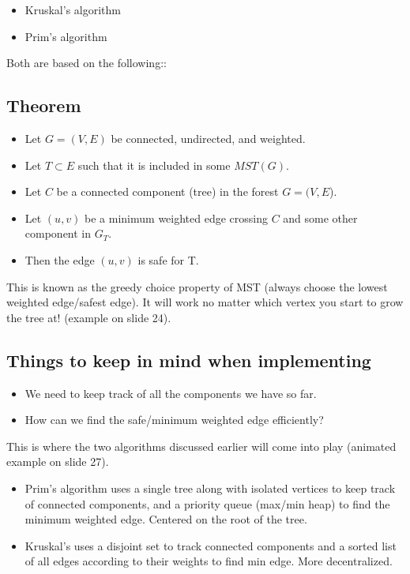 \documentclass[12pt]{book}
\begin{document}
\begin{itemize}
    \item Kruskal's algorithm
    \item Prim's algorithm
\end{itemize}

Both are based on the following::

\subsection*{Theorem}
\begin{itemize}
    \item Let $G=(V,E)$ be connected, undirected, and weighted.
    \item Let $T\subset E$ such that it is included in some $MST(G)$.
    \item Let $C$ be a connected component (tree) in the forest $G=(V,E$).
    \item Let $(u,v)$ be a minimum weighted edge crossing $C$ and some other component in $G_T$.
    \item Then the edge $(u,v)$ is safe for T.
\end{itemize}

This is known as the greedy choice property of MST (always choose the lowest weighted edge/safest edge). It will work no matter which vertex you start to grow the tree at! (example on slide 24).

\subsection*{Things to keep in mind when implementing}

\begin{itemize}
    \item We need to keep track of all the components we have so far.
    \item How can we find the safe/minimum weighted edge efficiently?
\end{itemize}

This is where the two algorithms discussed earlier will come into play (animated example on slide 27).

\begin{itemize}
    \item Prim's algorithm uses a single tree along with isolated vertices to keep track of connected components, and a priority queue (max/min heap) to find the minimum weighted edge. Centered on the root of the tree.
    \item Kruskal's uses a disjoint set to track connected components and a sorted list of all edges according to their weights to find min edge. More decentralized.
\end{itemize}
\end{document}
